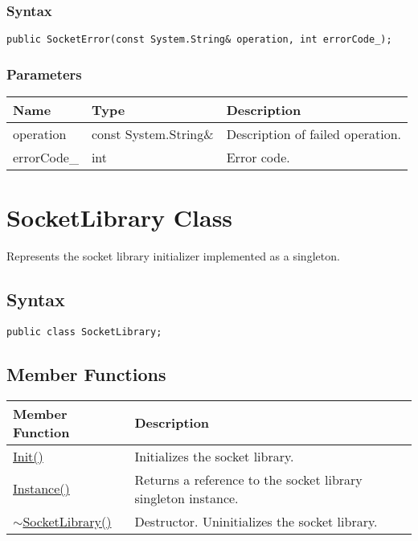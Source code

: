 \documentclass[a4paper,oneside,11.000000pt]{book}
\begin{document}
\subsubsection*{Syntax}
\texttt{public SocketError(const System.String\& operation, int errorCode\_);}
\subsubsection*{Parameters}
\begin{flushleft}
\begin{supertabular}[l]{lll}
\textbf{Name}
& \textbf{Type}
& \textbf{Description}
\\
\hline
operation
& const System.\-String\&\-
& Description of failed operation.

\\
errorCode\_
& int
& Error code.

\\
\end{supertabular}

\end{flushleft}
\clearpage

\hypertarget{System.Net.Sockets.SocketLibrary}{\section{SocketLibrary Class}}
\begin{flushleft}
Represents the socket library initializer implemented as a singleton.

\end{flushleft}
\subsection*{Syntax}\texttt{public class SocketLibrary;}

\subsection{Member Functions}
\begin{flushleft}
\begin{supertabular}[l]{!{\raggedright}p{4.19644cm}!{\raggedright}p{10.9536cm}}
\textbf{Member Function}
& \textbf{Description}
\\
\hline
\hyperlink{System.Net.Sockets.SocketLibrary.Init.P.System.Net.Sockets.SocketLibrary}{Init()}
& Initializes the socket library.

\\
\hyperlink{System.Net.Sockets.SocketLibrary.Instance}{Instance()}
& Returns a reference to the socket library singleton instance.

\\
\hyperlink{System.Net.Sockets.SocketLibrary.destructor.P.System.Net.Sockets.SocketLibrary}{$\sim$SocketLibrary()}
& Destructor. Uninitializes the socket library.

\\
\end{supertabular}

\end{flushleft}
\clearpage
\end{document}
